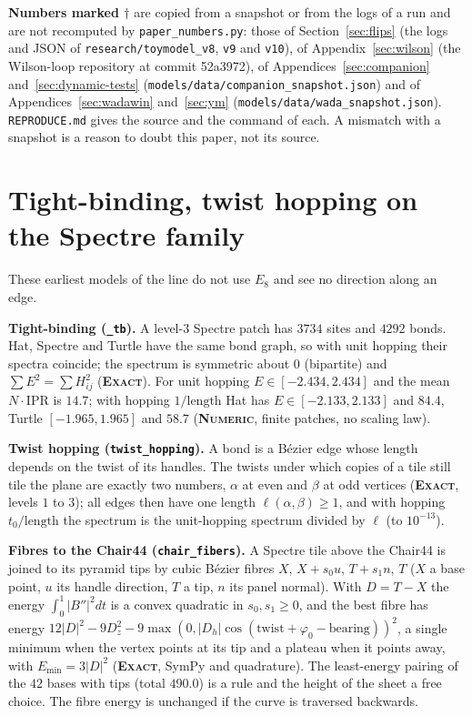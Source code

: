 \documentclass[11pt]{article}
\newcommand{\exact}{\textbf{\textsc{Exact}}}
\newcommand{\numeric}{\textbf{\textsc{Numeric}}}
\theoremstyle{definition}
\begin{document}
\textbf{Numbers marked $\dagger$} are copied from a snapshot or from the logs of a run and are not recomputed by \texttt{paper\_numbers.py}: those of Section~\ref{sec:flips} (the logs and JSON of \texttt{research/toymodel\_v8}, \texttt{v9} and \texttt{v10}), of Appendix~\ref{sec:wilson} (the Wilson-loop repository at commit 52a3972), of Appendices~\ref{sec:companion} and~\ref{sec:dynamic-tests} (\texttt{models/data/companion\_snapshot.json}) and of Appendices~\ref{sec:wadawin} and~\ref{sec:ym} (\texttt{models/data/wada\_snapshot.json}). \texttt{REPRODUCE.md} gives the source and the command of each. A mismatch with a snapshot is a reason to doubt this paper, not its source.

\section{Tight-binding, twist hopping on the Spectre family}\label{app:tb}
These earliest models of the line do not use $E_8$ and see no direction along an edge.

\textbf{Tight-binding (\texttt{\_tb}).} A level-$3$ Spectre patch has $3734$ sites and $4292$ bonds. Hat, Spectre and Turtle have the same bond graph, so with unit hopping their spectra coincide; the spectrum is symmetric about $0$ (bipartite) and $\sum E^2=\sum H_{ij}^2$ (\exact). For unit hopping $E\in[-2.434,2.434]$ and the mean $N\cdot\mathrm{IPR}$ is $14.7$; with hopping $1/\text{length}$ Hat has $E\in[-2.133,2.133]$ and $84.4$, Turtle $[-1.965,1.965]$ and $58.7$ (\numeric, finite patches, no scaling law).

\textbf{Twist hopping (\texttt{twist\_hopping}).} A bond is a B\'ezier edge whose length depends on the twist of its handles. The twists under which copies of a tile still tile the plane are exactly two numbers, $\alpha$ at even and $\beta$ at odd vertices (\exact, levels $1$ to $3$); all edges then have one length $\ell(\alpha,\beta)\ge1$, and with hopping $t_0/\text{length}$ the spectrum is the unit-hopping spectrum divided by $\ell$ (to $10^{-13}$).

\textbf{Fibres to the Chair44 (\texttt{chair\_fibers}).} A Spectre tile above the Chair44 is joined to its pyramid tips by cubic B\'ezier fibres $X$, $X+s_0u$, $T+s_1n$, $T$ ($X$ a base point, $u$ its handle direction, $T$ a tip, $n$ its panel normal). With $D=T-X$ the energy $\int_0^1|B''|^2dt$ is a convex quadratic in $s_0,s_1\ge0$, and the best fibre has energy $12|D|^2-9D_z^2-9\max(0,|D_h|\cos(\text{twist}+\varphi_0-\text{bearing}))^2$, a single minimum when the vertex points at its tip and a plateau when it points away, with $E_{\min}=3|D|^2$ (\exact, SymPy and quadrature). The least-energy pairing of the $42$ bases with tips (total $490.0$) is a rule and the height of the sheet a free choice. The fibre energy is unchanged if the curve is traversed backwards.
\end{document}
